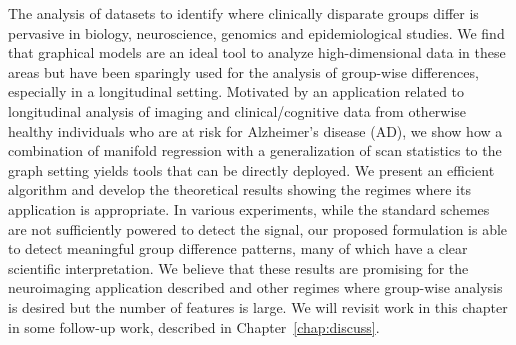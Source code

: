 The analysis of datasets to identify where clinically disparate groups differ is pervasive in biology, neuroscience, genomics and epidemiological studies. 
We find that graphical models are an ideal tool to analyze high-dimensional data in these areas but have been sparingly used for the analysis of 
group-wise differences, especially in a longitudinal setting. 
Motivated by an application related to longitudinal analysis of imaging and clinical/cognitive data from otherwise healthy individuals 
who are at risk for Alzheimer's disease (AD), we show how a combination of manifold regression with a generalization of scan statistics to the graph setting yields 
tools that can be directly deployed. 
We present an efficient algorithm and develop the theoretical results showing the regimes where its application is appropriate. 
In various experiments, while the standard schemes are not sufficiently powered to detect the signal, our proposed formulation is able to 
detect meaningful group difference patterns, many of which have a clear scientific interpretation. 
We believe that these results are promising for the neuroimaging application 
described and other regimes where group-wise analysis is desired but the number of features is large. 
We will revisit work in this chapter in some follow-up work, described in Chapter~\ref{chap:discuss}.
